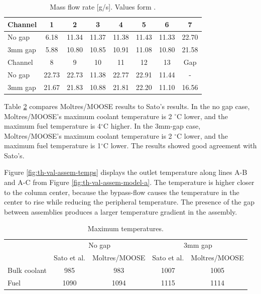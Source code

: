 \begin{table}[htbp!]
\centering
  \caption{Mass flow rate [g/s]. Values form \cite{sato_computational_2010}.}
  \label{tab:th-val-assem-massflow}
  \begin{tabular}{l|ccccccc}
\toprule
Channel & 1 & 2 & 3 & 4 & 5 & 6 & 7 \\
\midrule
No gap  & 6.18 & 11.34 & 11.37 & 11.38 & 11.43 & 11.33 & 22.70 \\
3mm gap & 5.88 & 10.80 & 10.85 & 10.91 & 11.08 & 10.80 & 21.58 \\
\midrule
Channel & 8 & 9 & 10 & 11 & 12 & 13 & Gap \\
\midrule
No gap  & 22.73 & 22.73 & 11.38 & 22.77 & 22.91 & 11.44 & -     \\
3mm gap & 21.67 & 21.83 & 10.88 & 21.81 & 22.20 & 11.10 & 16.56 \\
\bottomrule
\end{tabular}
\end{table}

Table \ref{tab:th-val-assem-results} compares Moltres/MOOSE results to Sato's results.
In the no gap case, Moltres/MOOSE's maximum coolant temperature is 2 $^{\circ}$C lower, and the maximum fuel temperature is 4$^{\circ}$C higher.
In the 3mm-gap case, Moltres/MOOSE's maximum coolant temperature is 2 $^{\circ}$C lower, and the maximum fuel temperature is 1$^{\circ}$C lower.
The results showed good agreement with Sato's.

Figure \ref{fig:th-val-assem-temps} displays the outlet temperature along lines A-B and A-C from Figure \ref{fig:th-val-assem-model-a}.
The temperature is higher closer to the column center, because the bypass-flow causes the temperature in the center to rise while reducing the peripheral temperature.
The presence of the gap between assemblies produces a larger temperature gradient in the assembly.

\begin{table}[htbp!]
  \centering
  \caption{Maximum temperatures.}
  \label{tab:th-val-assem-results}
\begin{tabular}{l|c|c|c|c}
\toprule
        & \multicolumn{2}{c|}{No gap} & \multicolumn{2}{c}{3mm gap} \\ \cline{2-5}
        & Sato et al. & Moltres/MOOSE & Sato et al. & Moltres/MOOSE \\ \midrule
Bulk coolant & 985     & 983               & 1007     & 1005             \\  
Fuel    & 1090    & 1094              & 1115     & 1114             \\
\bottomrule
\end{tabular}
\end{table}


